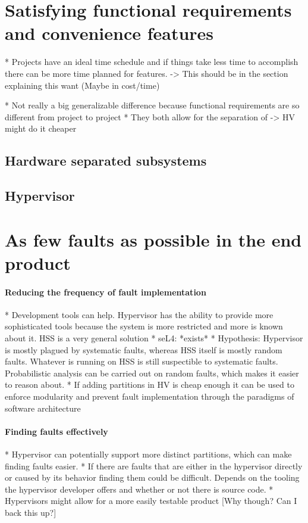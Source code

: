 
\section{Satisfying functional requirements and convenience features}

* Projects have an ideal time schedule and if things take less time to accomplish there can be more time planned for features.
    -> This should be in the section explaining this want (Maybe in cost/time)
    
* Not really a big generalizable difference because functional requirements are so different from project to project
* They both allow for the separation of
    -> HV might do it cheaper 
\subsection{Hardware separated subsystems}
\subsection{Hypervisor}


\section{As few faults as possible in the end product}
\paragraph{Reducing the frequency of fault implementation}
* Development tools can help. Hypervisor has the ability to provide more sophisticated tools because the system is more restricted and more is known about it. HSS is a very general solution
* seL4: *exists*
* Hypothesis: Hypervisor is mostly plagued by systematic faults, whereas HSS itself is mostly random faults. Whatever is running on HSS is still suspectible to systematic faults. Probabilistic analysis can be carried out on random faults, which makes it easier to reason about.
* If adding partitions in HV is cheap enough it can be used to enforce modularity and prevent fault implementation through the paradigms of software architecture
\paragraph{Finding  faults effectively}
* Hypervisor can potentially support more distinct partitions, which can make finding faults easier. 
* If there are faults that are either in the hypervisor directly or caused by its behavior finding them could be difficult. Depends on the tooling the hypervisor developer offers and whether or not there is source code.
* Hypervisors might allow for a more easily testable product [Why though? Can I back this up?]
